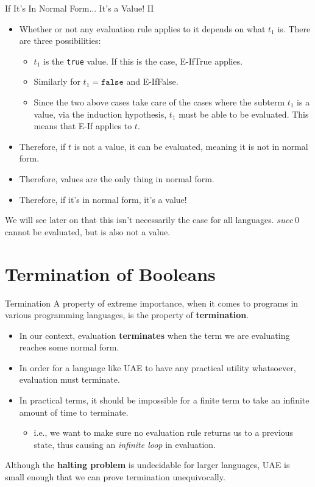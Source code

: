 \documentclass[11pt]{beamer}
\begin{document}
\begin{frame}[fragile=singleslide]{If It's In Normal Form... It's a Value! II}
\begin{itemize}
\item Whether or not any evaluation rule applies to it depends on what $t_1$ is.  There are three possibilities:
\begin{itemize}
\item $t_1$ is the \texttt{true} value.  If this is the case, E-IfTrue applies.
\item Similarly for $t_1 = \texttt{false}$ and E-IfFalse.
\item Since the two above cases take care of the cases where the subterm $t_1$ is a value, via the induction hypothesis, $t_1$ must be able to be evaluated.  This means that E-If applies to $t$.
\end{itemize}
\item Therefore, if $t$ is not a value, it can be evaluated, meaning it is not in normal form.
\item Therefore, values are the only thing in normal form.
\item Therefore, if it's in normal form, it's a value! 
\end{itemize}
We will see later on that this isn't necessarily the case for all languages.  $succ\:0$ cannot be evaluated, but is also not a value.  
\end{frame}

\section[Termination]{Termination of Booleans}
\begin{frame}[fragile=singleslide]{Termination}
A property of extreme importance, when it comes to programs in various programming languages, is the property of \textbf{termination}.
\begin{itemize}
\item In our context, evaluation \textbf{terminates} when the term we are evaluating reaches some normal form.  
\item In order for a language like UAE to have any practical utility whatsoever, evaluation must terminate.
\item In practical terms, it should be impossible for a finite term to take an infinite amount of time to terminate.
\begin{itemize}
\item i.e., we want to make sure no evaluation rule returns us to a previous state, thus causing an \emph{infinite loop} in evaluation.  
\end{itemize}
\end{itemize}
Although the \textbf{halting problem} is undecidable for larger languages, UAE is small enough that we can prove termination unequivocally.  
\end{frame}
\end{document}

